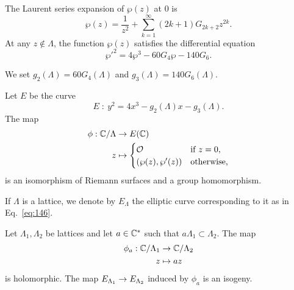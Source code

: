 \begin{theorem}
  The Laurent series expansion of $\wp(z)$ at $0$ is
  \begin{equation}
    \label{eq:144}
    \wp(z) = \frac{1}{z^2} + \sum_{k=1}^\infty (2k+1)G_{2k+2}z^{2k}
    \text{.}
  \end{equation}
  At any $z\not\in\Lambda$, the function $\wp(z)$ satisfies the
  differential equation
  \begin{equation}
    \label{eq:145}
    {\wp'}^2 = 4\wp^3 - 60G_4\wp - 140G_6
    \text{.}
  \end{equation}
\end{theorem}

We set $g_2(\Lambda)=60G_4(\Lambda)$ and $g_3(\Lambda)=140G_6(\Lambda)$.

\begin{theorem}
  Let $E$ be the curve 
  \begin{equation}
    \label{eq:146}
    E\;:\: y^2=4x^3-g_2(\Lambda)x-g_3(\Lambda)
    \text{.}
  \end{equation}
  The map
  \begin{equation}
    \label{eq:147}
    \begin{aligned}
      \phi: \mathbb{C}/\Lambda &\rightarrow E(\mathbb{C})\\
      z &\mapsto
      \begin{cases}
        \mathcal{O} &\text{if $z=0$,}\\
        (\wp(z), \wp'(z)) &\text{otherwise,}
      \end{cases}
    \end{aligned}
  \end{equation}
  is an isomorphism of Riemann surfaces and a group homomorphism. 
\end{theorem}

If $\Lambda$ is a lattice, we denote by $E_\Lambda$ the elliptic curve
corresponding to it as in Eq.~\eqref{eq:146}.

\begin{theorem}
  Let $\Lambda_1,\Lambda_2$ be lattices and let $a\in\mathbb{C}^\ast$ such that
  $a\Lambda_1\subset\Lambda_2$. The map
  \begin{equation}
    \label{eq:148}
    \begin{aligned}
      \phi_a:\mathbb{C}/\Lambda_1&\rightarrow\mathbb{C}/\Lambda_2\\
      z&\mapsto az
    \end{aligned}
  \end{equation}
  is holomorphic. The map $E_{\Lambda_1}\rightarrow E_{\Lambda_2}$ induced by
  $\phi_a$ is an isogeny.
\end{theorem}

